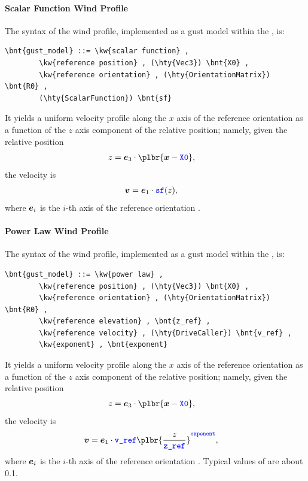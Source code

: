 


\paragraph{Scalar Function Wind Profile}
The syntax of the  wind profile,
implemented as a gust model within the , is:
\begin{Verbatim}[commandchars=\\\{\}]
    \bnt{gust_model} ::= \kw{scalar function} ,
        \kw{reference position} , (\hty{Vec3}) \bnt{X0} ,
        \kw{reference orientation} , (\hty{OrientationMatrix}) \bnt{R0} ,
        (\hty{ScalarFunction}) \bnt{sf}
\end{Verbatim}
It yields a uniform velocity profile along the $x$ axis of the
reference orientation as a function of the $z$ axis component
of the relative position; namely, given the relative position
\begin{align}
	z &= \T{e}_3 \cdot \plbr{\T{x} - \nt{X0}}
	,
\end{align}
the velocity is
\begin{align}
	\boldsymbol{v}
	&=
	\boldsymbol{e}_1 \cdot \textcolor{blue}{\texttt{sf}}(z)
	,
\end{align}
where $\boldsymbol{e}_i$ is the $i$-th axis of the reference orientation .



\paragraph{Power Law Wind Profile}
The syntax of the  wind profile, implemented as a gust model
within the , is:
\begin{Verbatim}[commandchars=\\\{\}]
    \bnt{gust_model} ::= \kw{power law} ,
        \kw{reference position} , (\hty{Vec3}) \bnt{X0} ,
        \kw{reference orientation} , (\hty{OrientationMatrix}) \bnt{R0} ,
        \kw{reference elevation} , \bnt{z_ref} ,
        \kw{reference velocity} , (\hty{DriveCaller}) \bnt{v_ref} ,
        \kw{exponent} , \bnt{exponent}
\end{Verbatim}
It yields a uniform velocity profile along the $x$ axis of the
reference orientation as a function of the $z$ axis component
of the relative position; namely, given the relative position
\begin{align}
	z &= \T{e}_3 \cdot \plbr{\T{x} - \nt{X0}}
	,
\end{align}
the velocity is
\begin{align}
	\T{v}
	&=
	\T{e}_1 \cdot \nt{v\_ref} \plbr{\frac{z}{\nt{z\_ref}}}^{\nt{exponent}}
	,
\end{align}
where $\boldsymbol{e}_i$ is the $i$-th axis of the reference orientation .
Typical values of  are about 0.1.



